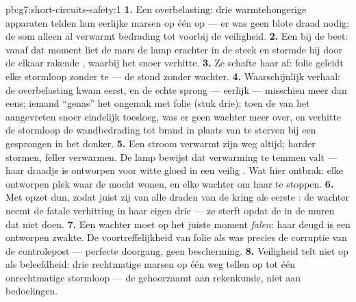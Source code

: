\begin{solution}{pb:g7:short-circuits-safety:1}
\textbf{1.} Een overbelasting: drie warmtehongerige apparaten telden
hun eerlijke marsen op één  op --- er was geen blote draad nodig;
de som alleen al verwarmt bedrading tot voorbij de veiligheid.
\textbf{2.} Een  bij de beet: vanaf dat moment liet de
mars de lamp erachter in de steek en stormde hij door de elkaar
rakende , waarbij het snoer verhitte.
\textbf{3.} Ze schafte haar af: folie geleidt elke stormloop zonder te
 --- de  stond zonder wachter.
\textbf{4.} Waarschijnlijk verhaal: de overbelasting kwam eerst, en de
echte  sprong --- eerlijk --- misschien meer dan eens; iemand
``genas'' het ongemak met folie (stuk drie); toen de  van
het aangevreten snoer eindelijk toesloeg, was er geen wachter meer
over, en verhitte de stormloop de wandbedrading tot brand in plaats
van te sterven bij een gesprongen  in het donker.
\textbf{5.} Een stroom verwarmt zijn weg altijd; harder stormen,
feller verwarmen. De lamp bewijst dat verwarming te temmen valt ---
haar draadje is ontworpen voor witte gloed in een veilig
. Wat hier ontbrak: elke ontworpen plek waar de
 mocht wonen, en elke wachter om haar te stoppen.
\textbf{6.} Met opzet dun, zodat juist zij van alle draden van de
kring als eerste : de wachter neemt de fatale verhitting in
haar eigen drie  --- ze sterft opdat de  in de muren
dat niet doen.
\textbf{7.} Een wachter moet op het juiste moment \emph{falen}: haar
deugd is een ontworpen zwakte. De voortreffelijkheid van folie als
 was precies de corruptie van de controlepost --- perfecte
doorgang, geen bescherming.
\textbf{8.} Veiligheid telt niet op als beleefdheid: drie rechtmatige
marsen op één weg tellen op tot één onrechtmatige stormloop --- de
 gehoorzaamt aan rekenkunde, niet aan bedoelingen.

\end{solution}
